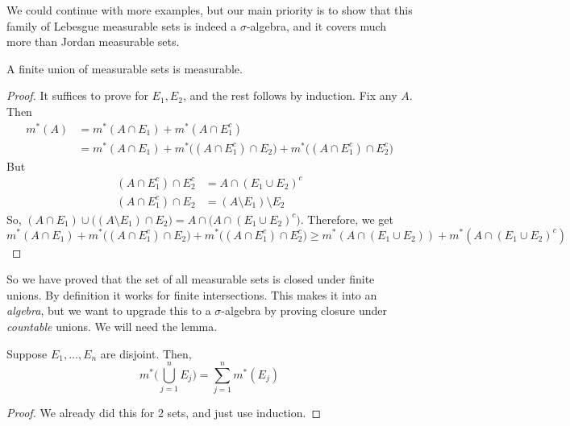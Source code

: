   We could continue with more examples, but our main priority is to show that this family of Lebesgue measurable sets is indeed a $\sigma$-algebra, and it covers much more than Jordan measurable sets. 

  \begin{theorem}
    A finite union of measurable sets is measurable. 
  \end{theorem}
  \begin{proof}
    It suffices to prove for $E_1, E_2$, and the rest follows by induction. Fix any $A$. Then 
    \begin{align}
      m^\ast (A) & = m^\ast (A \cap E_1) + m^\ast (A \cap E_1^c) \\ 
                   & = m^\ast (A \cap E_1) + m^\ast \big((A \cap E_1^c) \cap E_2 \big) + m^\ast \big((A \cap E_1^c) \cap E_2^c \big)
    \end{align}
    But 
    \begin{align}
      (A \cap E_1^c) \cap E_2^c & = A \cap (E_1 \cup E_2)^c \\ 
      (A \cap E_1^c) \cap E_2 & = (A \setminus E_1) \setminus E_2 
    \end{align}
    So, $(A \cap E_1) \cup \big( (A \setminus E_1) \cap E_2 \big) = A \cap \big(A \cap (E_1 \cup E_2)^c \big)$. Therefore, we get 
    \begin{equation}
      m^\ast (A \cap E_1) + m^\ast \big((A \cap E_1^c) \cap E_2 \big) + m^\ast \big((A \cap E_1^c) \cap E_2^c \big) \geq m^\ast (A \cap (E_1 \cup E_2)) + m^\ast ( A \cap (E_1 \cup E_2)^c ) 
    \end{equation}
  \end{proof} 

  So we have proved that the set of all measurable sets is closed under finite unions. By definition it works for finite intersections. This makes it into an \textit{algebra}, but we want to upgrade this to a $\sigma$-algebra by proving closure under \textit{countable} unions. We will need the lemma. 

  \begin{lemma} 
    Suppose $E_1, \ldots, E_n$ are disjoint. Then, 
    \begin{equation}
      m^\ast \bigg( \bigcup_{j=1}^n E_j \bigg) = \sum_{j=1}^n m^\ast (E_j)
    \end{equation}
  \end{lemma}
  \begin{proof}
    We already did this for 2 sets, and just use induction. 
  \end{proof} 

